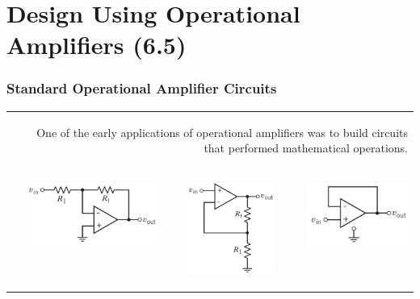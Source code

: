 \documentclass[aspectratio=169]{beamer}
\begin{document}
\section{Design Using Operational Amplifiers (6.5)}
\begin{frame}[fragile]
\frametitle{Standard Operational Amplifier Circuits}
\begin{tabular}{r}

		\begin{columns}	\column{1\textwidth}
 One of the early applications of operational amplifiers was to build circuits that performed mathematical
operations.	\newline 
	\end{columns} \\


	\begin{columns}
		\begin{column}{.33\textwidth}  %
		\begin{center}
			\includegraphics[height=2.0cm]{figura16.png}
			\end{center}			

		\end{column}
		\begin{column}{.33\textwidth}  %
			\includegraphics[height=3.0cm]{figura17.png}
		\end{column}
		\begin{column}{.33\textwidth}  %
			\includegraphics[height=2.0cm]{figura18.png}
		\end{column}
	
	\end{columns} \\
	

\end{tabular}
\end{frame}
\end{document}
